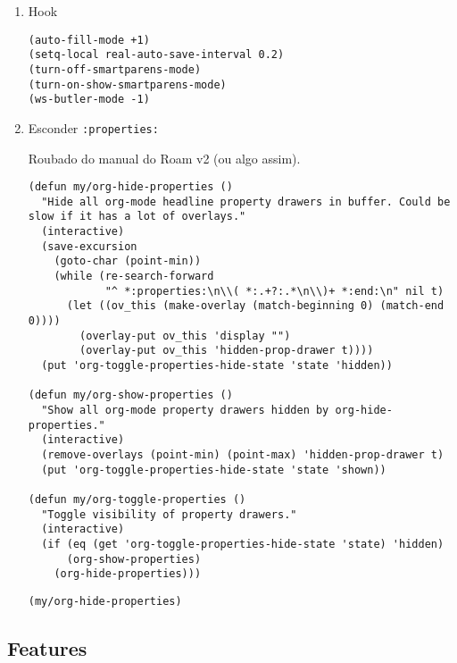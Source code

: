 \documentclass[11pt]{article}
\begin{document}
\begin{enumerate}
\begin{verbatim}
(map! :mode 'org-mode :g "C-S-s" #'org-latex-export-to-pdf)
\end{verbatim}

\item Hook
\label{sec:orgc17c6dd}

\begin{verbatim}
(auto-fill-mode +1)
(setq-local real-auto-save-interval 0.2)
(turn-off-smartparens-mode)
(turn-on-show-smartparens-mode)
(ws-butler-mode -1)
\end{verbatim}

\item Esconder \texttt{:properties:}
\label{sec:org25d5918}

Roubado do manual do Roam v2 (ou algo assim).

\begin{verbatim}
(defun my/org-hide-properties ()
  "Hide all org-mode headline property drawers in buffer. Could be
slow if it has a lot of overlays."
  (interactive)
  (save-excursion
    (goto-char (point-min))
    (while (re-search-forward
            "^ *:properties:\n\\( *:.+?:.*\n\\)+ *:end:\n" nil t)
      (let ((ov_this (make-overlay (match-beginning 0) (match-end 0))))
        (overlay-put ov_this 'display "")
        (overlay-put ov_this 'hidden-prop-drawer t))))
  (put 'org-toggle-properties-hide-state 'state 'hidden))

(defun my/org-show-properties ()
  "Show all org-mode property drawers hidden by org-hide-properties."
  (interactive)
  (remove-overlays (point-min) (point-max) 'hidden-prop-drawer t)
  (put 'org-toggle-properties-hide-state 'state 'shown))

(defun my/org-toggle-properties ()
  "Toggle visibility of property drawers."
  (interactive)
  (if (eq (get 'org-toggle-properties-hide-state 'state) 'hidden)
      (org-show-properties)
    (org-hide-properties)))
\end{verbatim}

\begin{verbatim}
(my/org-hide-properties)
\end{verbatim}
\end{enumerate}

\subsection{Features}
\label{sec:orgfd9efe5}
\end{document}
